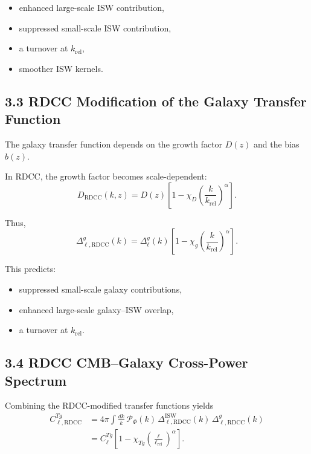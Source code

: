 \documentclass[11pt,a4paper]{article}
\begin{document}
\begin{itemize}
    \item enhanced large-scale ISW contribution,
    \item suppressed small-scale ISW contribution,
    \item a turnover at $k_{\mathrm{rel}}$,
    \item smoother ISW kernels.
\end{itemize}

\subsection*{3.3 RDCC Modification of the Galaxy Transfer Function}

The galaxy transfer function depends on the growth factor $D(z)$ and the bias $b(z)$.

In RDCC, the growth factor becomes scale-dependent:
\begin{equation}
    D_{\mathrm{RDCC}}(k,z)
    = D(z)
      \left[
        1 - \chi_{D}
        \left(\frac{k}{k_{\mathrm{rel}}}\right)^{\alpha}
      \right].
\end{equation}

Thus,
\begin{equation}
    \Delta_{\ell,\mathrm{RDCC}}^{g}(k)
    = \Delta_{\ell}^{g}(k)
      \left[
        1 - \chi_{g}
        \left(\frac{k}{k_{\mathrm{rel}}}\right)^{\alpha}
      \right].
\end{equation}

This predicts:

\begin{itemize}
    \item suppressed small-scale galaxy contributions,
    \item enhanced large-scale galaxy–ISW overlap,
    \item a turnover at $k_{\mathrm{rel}}$.
\end{itemize}

\subsection*{3.4 RDCC CMB–Galaxy Cross-Power Spectrum}

Combining the RDCC-modified transfer functions yields
\begin{align}
    C_{\ell,\mathrm{RDCC}}^{Tg}
    &= 4\pi \int \frac{dk}{k}\,
       \mathcal{P}_{\Phi}(k)\,
       \Delta_{\ell,\mathrm{RDCC}}^{\mathrm{ISW}}(k)\,
       \Delta_{\ell,\mathrm{RDCC}}^{g}(k) \\
    &= C_{\ell}^{Tg}
       \left[
         1 - \chi_{Tg}
         \left(\frac{\ell}{\ell_{\mathrm{rel}}}\right)^{\alpha}
       \right].
\end{align}
\end{document}
